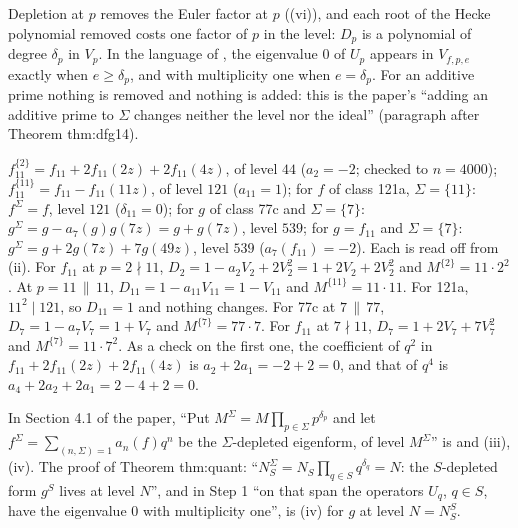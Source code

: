 \begin{remark}\label{rem:hecke:why-delta}
Depletion at $p$ removes the Euler factor at $p$ ((vi)), and each root of the Hecke polynomial removed costs one factor of $p$ in the level: $D_p$ is a polynomial
of degree $\delta_p$ in $V_p$. In the language of , the eigenvalue $0$ of $U_p$ appears in $V_{f,p,e}$ exactly when $e\ge\delta_p$, and with multiplicity one when
$e=\delta_p$. For an additive prime nothing is removed and nothing is added: this is the paper's ``adding an additive prime to $\Sigma$ changes neither the level nor the ideal''
(paragraph after Theorem thm:dfg14).
\end{remark}

\begin{example}\label{ex:hecke:depleted}
$f_{11}^{\{2\}}=f_{11}+2f_{11}(2z)+2f_{11}(4z)$, of level $44$ ($a_2=-2$; checked to $n=4000$); $f_{11}^{\{11\}}=f_{11}-f_{11}(11z)$, of level $121$ ($a_{11}=1$); for $f$ of class 121a, $\Sigma=\{11\}$:
$f^\Sigma=f$, level $121$ ($\delta_{11}=0$); for $g$ of class 77c and $\Sigma=\{7\}$: $g^\Sigma=g-a_7(g)g(7z)=g+g(7z)$, level $539$; for $g=f_{11}$ and $\Sigma=\{7\}$: $g^\Sigma=g+2g(7z)+7g(49z)$, level $539$
($a_7(f_{11})=-2$). Each is read off from (ii). For $f_{11}$ at $p=2\nmid11$, $D_2=1-a_2V_2+2V_2^2=1+2V_2+2V_2^2$ and $M^{\{2\}}=11\cdot2^2$. At $p=11\,\|\,11$,
$D_{11}=1-a_{11}V_{11}=1-V_{11}$ and $M^{\{11\}}=11\cdot11$. For 121a, $11^2\mid121$, so $D_{11}=1$ and nothing changes. For 77c at $7\,\|\,77$, $D_7=1-a_7V_7=1+V_7$ and
$M^{\{7\}}=77\cdot7$. For $f_{11}$ at $7\nmid11$, $D_7=1+2V_7+7V_7^2$ and $M^{\{7\}}=11\cdot7^2$. As a check on the first one, the coefficient of $q^2$ in
$f_{11}+2f_{11}(2z)+2f_{11}(4z)$ is $a_2+2a_1=-2+2=0$, and that of $q^4$ is $a_4+2a_2+2a_1=2-4+2=0$.
\end{example}

\begin{paperlink}\label{pl:hecke:section41}
In Section 4.1 of the paper, ``Put $M^\Sigma=M\prod_{p\in\Sigma}p^{\delta_p}$ and let $f^\Sigma=\sum_{(n,\Sigma)=1}a_n(f)q^n$ be the $\Sigma$-depleted eigenform, of level $M^\Sigma$'' is
 and (iii), (iv). The proof of Theorem thm:quant: ``$N_S^\Sigma=N_S\prod_{q\in S}q^{\delta_q}=N$: the $S$-depleted form $g^S$ lives at level
$N$'', and in Step 1 ``on that span the operators $U_q$, $q\in S$, have the eigenvalue $0$ with multiplicity one'', is (iv) for $g$ at level $N=N_S^S$.
\end{paperlink}

